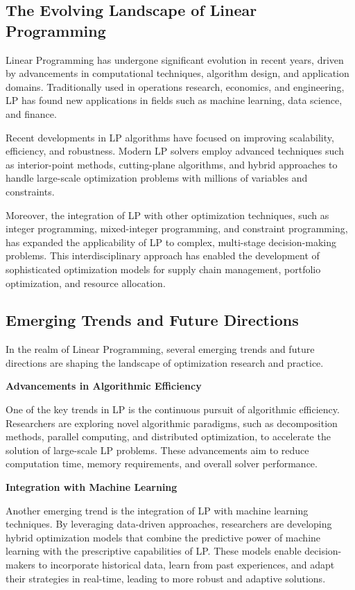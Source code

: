 \documentclass[12pt]{book} %
\begin{document}
\subsection{The Evolving Landscape of Linear Programming}
Linear Programming has undergone significant evolution in recent years, driven by advancements in computational techniques, algorithm design, and application domains. Traditionally used in operations research, economics, and engineering, LP has found new applications in fields such as machine learning, data science, and finance.

Recent developments in LP algorithms have focused on improving scalability, efficiency, and robustness. Modern LP solvers employ advanced techniques such as interior-point methods, cutting-plane algorithms, and hybrid approaches to handle large-scale optimization problems with millions of variables and constraints.

Moreover, the integration of LP with other optimization techniques, such as integer programming, mixed-integer programming, and constraint programming, has expanded the applicability of LP to complex, multi-stage decision-making problems. This interdisciplinary approach has enabled the development of sophisticated optimization models for supply chain management, portfolio optimization, and resource allocation.

\subsection{Emerging Trends and Future Directions}
In the realm of Linear Programming, several emerging trends and future directions are shaping the landscape of optimization research and practice.

\textbf{Advancements in Algorithmic Efficiency}


One of the key trends in LP is the continuous pursuit of algorithmic efficiency. Researchers are exploring novel algorithmic paradigms, such as decomposition methods, parallel computing, and distributed optimization, to accelerate the solution of large-scale LP problems. These advancements aim to reduce computation time, memory requirements, and overall solver performance.

\textbf{Integration with Machine Learning}


Another emerging trend is the integration of LP with machine learning techniques. By leveraging data-driven approaches, researchers are developing hybrid optimization models that combine the predictive power of machine learning with the prescriptive capabilities of LP. These models enable decision-makers to incorporate historical data, learn from past experiences, and adapt their strategies in real-time, leading to more robust and adaptive solutions.
\end{document}
